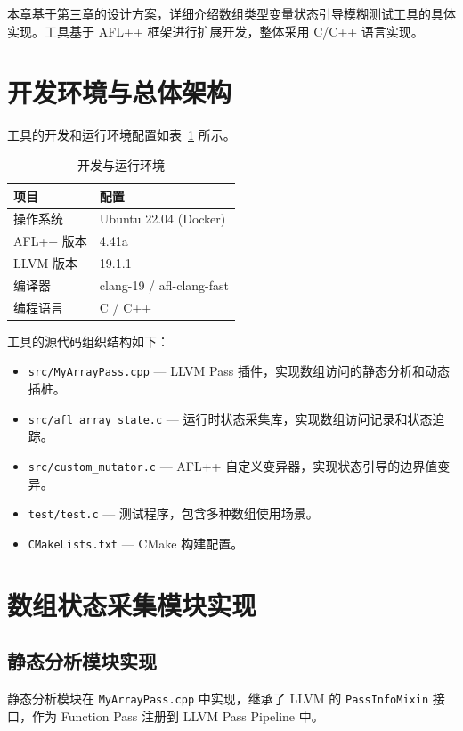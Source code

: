 \documentclass[bachelor]{njupthesis}
\begin{document}
本章基于第三章的设计方案，详细介绍数组类型变量状态引导模糊测试工具的具体实现。工具基于 AFL++ 框架进行扩展开发，整体采用 C/C++ 语言实现。

\section{开发环境与总体架构}

工具的开发和运行环境配置如表~\ref{tab:environment} 所示。

\begin{table}[hbt]
\centering
\caption{开发与运行环境}
\label{tab:environment}
\begin{tabular}{|l|l|}
\hline
\textbf{项目} & \textbf{配置} \\
\hline
操作系统 & Ubuntu 22.04 (Docker) \\
AFL++ 版本 & 4.41a \\
LLVM 版本 & 19.1.1 \\
编译器 & clang-19 / afl-clang-fast \\
编程语言 & C / C++ \\
\hline
\end{tabular}
\end{table}

工具的源代码组织结构如下：

\begin{itemize}
    \item \texttt{src/MyArrayPass.cpp} — LLVM Pass 插件，实现数组访问的静态分析和动态插桩。
    \item \texttt{src/afl\_array\_state.c} — 运行时状态采集库，实现数组访问记录和状态追踪。
    \item \texttt{src/custom\_mutator.c} — AFL++ 自定义变异器，实现状态引导的边界值变异。
    \item \texttt{test/test.c} — 测试程序，包含多种数组使用场景。
    \item \texttt{CMakeLists.txt} — CMake 构建配置。
\end{itemize}

\section{数组状态采集模块实现}

\subsection{静态分析模块实现}

静态分析模块在 \texttt{MyArrayPass.cpp} 中实现，继承了 LLVM 的 \texttt{PassInfoMixin} 接口，作为 Function Pass 注册到 LLVM Pass Pipeline 中。
\end{document}
